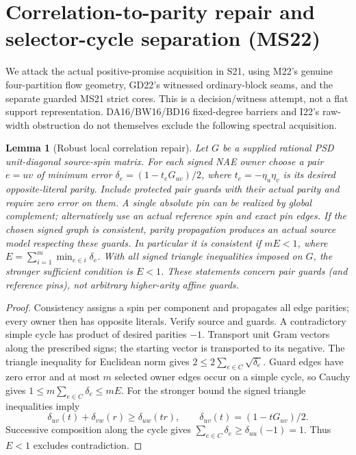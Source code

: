 \documentclass[11pt]{article}
\newtheorem{lemma}[theorem]{Lemma}
\begin{document}
\section{Correlation-to-parity repair and selector-cycle separation (MS22)}\label{sec:ms22}
We attack the actual positive-promise acquisition in S21, using M22's genuine four-partition flow geometry, GD22's witnessed ordinary-block seams, and the separate guarded MS21 strict cores. This is a decision/witness attempt, not a flat support representation. DA16/BW16/BD16 fixed-degree barriers and I22's raw-width obstruction do not themselves exclude the following spectral acquisition.

\begin{lemma}[Robust local correlation repair]\label{lem:ms22-round}
Let $G$ be a supplied rational PSD unit-diagonal source-spin matrix. For each signed NAE owner choose a pair $e=uv$ of minimum error $\delta_e=(1-t_eG_{uv})/2$, where $t_e=-\eta_u\eta_v$ is its desired opposite-literal parity. Include protected pair guards with their actual parity and require zero error on them. A single absolute pin can be realized by global complement; alternatively use an actual reference spin and exact pin edges. If the chosen signed graph is consistent, parity propagation produces an actual source model respecting these guards. In particular it is consistent if $mE<1$, where $E=\sum_{i=1}^m\min_{e\in i}\delta_e$. With all signed triangle inequalities imposed on $G$, the stronger sufficient condition is $E<1$. These statements concern pair guards (and reference pins), not arbitrary higher-arity affine guards.
\end{lemma}
\begin{proof}
Consistency assigns a spin per component and propagates all edge parities; every owner then has opposite literals. Verify source and guards. A contradictory simple cycle has product of desired parities $-1$. Transport unit Gram vectors along the prescribed signs; the starting vector is transported to its negative. The triangle inequality for Euclidean norm gives $2\le2\sum_{e\in C}\sqrt{\delta_e}$. Guard edges have zero error and at most $m$ selected owner edges occur on a simple cycle, so Cauchy gives $1\le m\sum_{e\in C}\delta_e\le mE$. For the stronger bound the signed triangle inequalities imply
\[
\delta_{uv}(t)+\delta_{vw}(r)\ge\delta_{uw}(tr),\qquad
\delta_{uv}(t)=(1-tG_{uv})/2 .
\]
Successive composition along the cycle gives $\sum_{e\in C}\delta_e\ge\delta_{uu}(-1)=1$. Thus $E<1$ excludes contradiction.
\end{proof}
\end{document}
